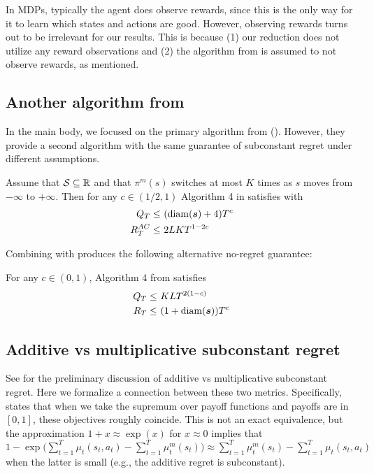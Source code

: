 In MDPs, typically the agent does observe rewards, since this is the only way for it to learn which states and actions are good. However, observing rewards turns out to be irrelevant for our results. This is because (1) our reduction does not utilize any reward observations and (2) the algorithm from \citet{plaut_avoiding_2024} is assumed to not observe rewards, as mentioned.




\subsection{Another algorithm from \citet{plaut_avoiding_2024}}

In the main body, we focused on the primary algorithm from \citet{plaut_avoiding_2024} (). However, they provide a second algorithm with the same guarantee of subconstant regret under different assumptions.

\begin{lemma}
\label{lem:bucket-regret}
Assume that $\mathcal{S} \subseteq \mathbb{R}$ and that $\pi^m(s)$ switches at most $K$ times as $s$ moves from $-\infty$ to $+\infty$. Then for any $c \in (1/2,1)$ Algorithm 4 in \citet{plaut_avoiding_2024} satisfies  with
\begin{align*}
Q_T  \le&\ (\operatorname*{diam}(\boldsymbol{s})+4)T^c\\
R_T^{AC} \le&\  2LKT^{1-2c}
\end{align*}
\end{lemma}

Combining  with  produces the following alternative no-regret guarantee:

\begin{theorem}
\label{thm:bucket}
For any $c \in (0,1)$, Algorithm 4 from \citet{plaut_avoiding_2024} satisfies
\begin{align*}
Q_T \le&\ KLT^{2(1-c)}\\
R_T  \le&\ (1+\operatorname*{diam}(\boldsymbol{s}))T^c
\end{align*}
\end{theorem}

\subsection{Additive vs multiplicative subconstant regret}

See  for the preliminary discussion of additive vs multiplicative subconstant regret. Here we formalize a connection between these two metrics. Specifically,  states that when we take the supremum over payoff functions and payoffs are in $[0,1]$, these objectives roughly coincide. This is not an exact equivalence, but the approximation $1+x \approx \exp(x)$ for $x \approx 0$ implies that $1-\exp \big(\sum_{t=1}^T \mu_t(s_t,a_t) -\sum_{t=1}^T \mu_t^m(s_t) \big) \approx  \sum_{t=1}^T \mu_t^m(s_t) - \sum_{t=1}^T \mu_t(s_t, a_t)$ when the latter is small (e.g., the additive regret is subconstant).

